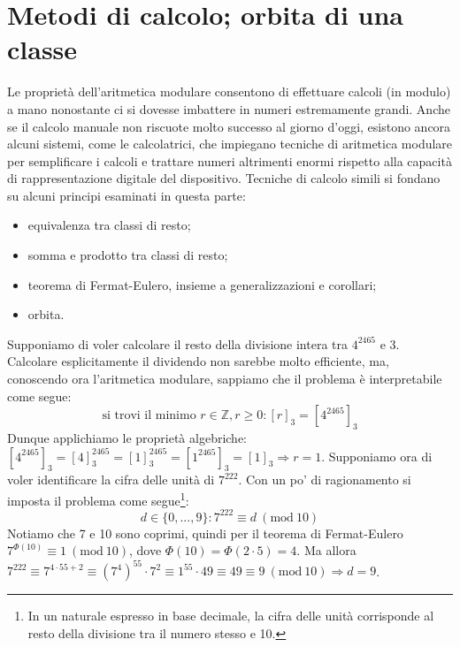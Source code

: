 \documentclass[oneside]{book}
\theoremstyle{remark}
\newcommand{\Mod}[1]{\ (\mathrm{mod}\ #1)} %
\begin{document}
\section{Metodi di calcolo; orbita di una classe}\label{orbit}
Le proprietà dell'aritmetica modulare consentono di effettuare calcoli (in modulo)
a mano nonostante ci si dovesse imbattere in numeri estremamente grandi.
Anche se il calcolo manuale non riscuote molto successo al giorno d'oggi,
esistono ancora alcuni sistemi, come le calcolatrici, che impiegano
tecniche di aritmetica modulare per semplificare i calcoli e trattare
numeri altrimenti enormi rispetto alla capacità di rappresentazione digitale
del dispositivo.
Tecniche di calcolo simili si fondano su alcuni principi esaminati in
questa parte:
\begin{itemize}
\item equivalenza tra classi di resto;
\item somma e prodotto tra classi di resto;
\item teorema di Fermat-Eulero, insieme a generalizzazioni e corollari;
\item orbita.
\end{itemize}
Supponiamo di voler calcolare il resto della divisione intera tra
$4^{2465}$ e $3$. Calcolare esplicitamente il dividendo non sarebbe
molto efficiente, ma, conoscendo ora l'aritmetica modulare, sappiamo
che il problema è interpretabile come segue:
\[ \text{si trovi il minimo } r\in\mathbb{Z},r\geq0: [r]_3 = [4^{2465}]_3 \]
Dunque applichiamo le proprietà algebriche: $[4^{2465}]_3 = [4]^{2465}_3 = [1]_3^{2465} = [1^{2465}]_3 = [1]_3 \Rightarrow r = 1$.
Supponiamo ora di voler identificare la cifra delle unità di $7^{222}$.
Con un po' di ragionamento si imposta il problema come segue\footnote{In un naturale espresso in
base decimale, la cifra delle unità corrisponde al resto della divisione tra il numero stesso e 10.}:
\[ d\in\{0,...,9\}: 7^{222}\equiv d\Mod{10} \]
Notiamo che 7 e 10 sono coprimi, quindi per il teorema di Fermat-Eulero
$7^{\Phi(10)}\equiv 1 \Mod{10}$, dove $\Phi(10)=\Phi(2\cdot5)=4$. Ma
allora $7^{222}\equiv 7^{4\cdot55+2} \equiv (7^4)^{55}\cdot7^2\equiv 1^{55}\cdot 49 \equiv 49\equiv 9 \Mod{10} \Rightarrow d=9$.
\end{document}
